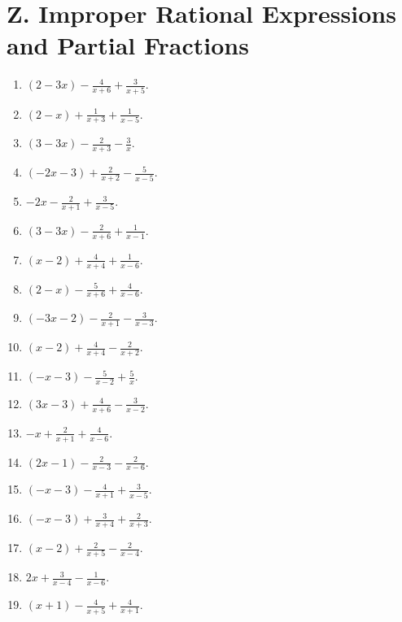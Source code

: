 \documentclass[11pt,oneside]{book}
\begin{document}
\section*{Z. Improper Rational Expressions and Partial Fractions}
\begin{enumerate}[leftmargin=*,label=\textbf{Z\arabic*.},itemsep=0.45\baselineskip]
\item $\displaystyle \left(2 - 3 x\right) - \frac{4}{x + 6} + \frac{3}{x + 5}$.
\item $\displaystyle \left(2 - x\right) + \frac{1}{x + 3} + \frac{1}{x - 5}$.
\item $\displaystyle \left(3 - 3 x\right) - \frac{2}{x + 3} - \frac{3}{x}$.
\item $\displaystyle \left(- 2 x - 3\right) + \frac{2}{x + 2} - \frac{5}{x - 5}$.
\item $\displaystyle - 2 x - \frac{2}{x + 1} + \frac{3}{x - 5}$.
\item $\displaystyle \left(3 - 3 x\right) - \frac{2}{x + 6} + \frac{1}{x - 1}$.
\item $\displaystyle \left(x - 2\right) + \frac{4}{x + 4} + \frac{1}{x - 6}$.
\item $\displaystyle \left(2 - x\right) - \frac{5}{x + 6} + \frac{4}{x - 6}$.
\item $\displaystyle \left(- 3 x - 2\right) - \frac{2}{x + 1} - \frac{3}{x - 3}$.
\item $\displaystyle \left(x - 2\right) + \frac{4}{x + 4} - \frac{2}{x + 2}$.
\item $\displaystyle \left(- x - 3\right) - \frac{5}{x - 2} + \frac{5}{x}$.
\item $\displaystyle \left(3 x - 3\right) + \frac{4}{x + 6} - \frac{3}{x - 2}$.
\item $\displaystyle - x + \frac{2}{x + 1} + \frac{4}{x - 6}$.
\item $\displaystyle \left(2 x - 1\right) - \frac{2}{x - 3} - \frac{2}{x - 6}$.
\item $\displaystyle \left(- x - 3\right) - \frac{4}{x + 1} + \frac{3}{x - 5}$.
\item $\displaystyle \left(- x - 3\right) + \frac{3}{x + 4} + \frac{2}{x + 3}$.
\item $\displaystyle \left(x - 2\right) + \frac{2}{x + 5} - \frac{2}{x - 4}$.
\item $\displaystyle 2 x + \frac{3}{x - 4} - \frac{1}{x - 6}$.
\item $\displaystyle \left(x + 1\right) - \frac{4}{x + 5} + \frac{4}{x + 1}$.

\end{enumerate}
\end{document}
